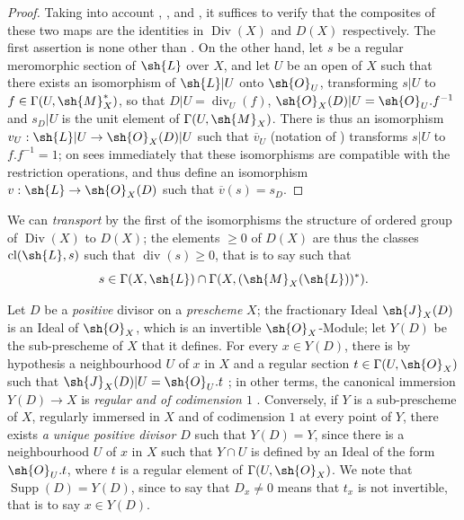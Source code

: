 \begin{proof}
Taking into account , , and , it suffices to verify that the composites of these two maps are the identities in $\operatorname{Div}(X)$ and $D(X)$ respectively.
The first assertion is none other than .
On the other hand, let $s$ be a regular meromorphic section of $\sh{L}$ over $X$, and let $U$ be an open of $X$ such that there exists an isomorphism of $\sh{L}|U$ onto $\sh{O}_U$, transforming $s|U$ to $f\in\Gamma(U,\sh{M}_X^*)$, so that $D|U=\operatorname{div}_U(f)$, $\sh{O}_X(D)|U=\sh{O}_U.f^{-1}$ and $s_D|U$ is the unit element of $\Gamma(U,\sh{M}_X)$.
There is thus an isomorphism $v_U:\sh{L}|U\to\sh{O}_X(D)|U$ such that $\overline{v}_U$ (notation of ) transforms $s|U$ to $f.f^{-1}=1$;
on sees immediately that these isomorphisms are compatible with the restriction operations, and thus define an isomorphism $v:\sh{L}\to\sh{O}_X(D)$ such that $\overline{v}(s)=s_D$.
\end{proof}

We can \emph{transport} by the first of the isomorphisms  the structure of ordered group of $\operatorname{Div}(X)$ to $D(X)$;
the elements $\geq 0$ of $D(X)$ are thus the classes $\operatorname{cl}(\sh{L},s)$ such that $\operatorname{div}(s)\geq 0$, that is to say  such that
\[
  s\in\Gamma(X,\sh{L})\cap\Gamma(X,(\sh{M}_X(\sh{L}))^*).
\]

\begin{env}[21.2.12]
\label{IV.21.2.12}
Let $D$ be a \emph{positive} divisor on a \emph{prescheme} $X$;
the fractionary Ideal $\sh{J}_X(D)$ is an Ideal of $\sh{O}_X$, which is an invertible $\sh{O}_X$-Module;
let $Y(D)$ be the sub-prescheme of $X$ that it defines.
For every $x\in Y(D)$, there is by hypothesis a neighbourhood $U$ of $x$ in $X$ and a regular section $t\in\Gamma(U,\sh{O}_X)$ such that $\sh{J}_X(D)|U=\sh{O}_U.t$ ;
in other terms, the canonical immersion $Y(D)\to X$ is \emph{regular and of codimension $1$} .
Conversely, if $Y$ is a sub-prescheme of $X$, regularly immersed in $X$ and of codimension $1$ at every point of $Y$, there exists \emph{a unique positive divisor $D$} such that $Y(D)=Y$, since there is a neighbourhood $U$ of $x$ in $X$ such that $Y\cap U$ is defined by an Ideal of the form $\sh{O}_U.t$, where $t$ is a regular element of $\Gamma(U,\sh{O}_X)$.
We note that $\operatorname{Supp}(D)=Y(D)$, since to say that $D_x\neq 0$ means that $t_x$ is not invertible, that is to say $x\in Y(D)$.
\end{env}

